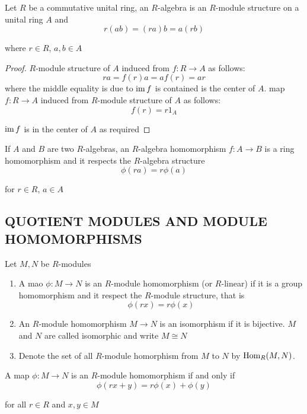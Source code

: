 \begin{remark}
	Let $R$ be a commutative unital ring, an $R$-algebra is an $R$-module structure on a unital ring $A$ and
	$$
		r (ab) = (ra) b = a (rb)
	$$
	
	where $r \in R$, $a, b \in A$
\end{remark}

\begin{proof}
	$R$-module structure of $A$ induced from $f: R \to A$ as follows:
	$$
		r a = f(r) a = a f(r) = a r
	$$
	where the middle equality is due to $\operatorname{im} f$ is contained is the center of $A$. map $f: R \to A$ induced from $R$-module structure of $A$ as follows:
	$$
		f(r) = r 1_A
	$$
	
	$\operatorname{im} f$ is in the center of $A$ as required
\end{proof}


\begin{definition}
	If $A$ and $B$ are two $R$-algebras, an $R$-algebra homomorphism $f: A \to B$ is a ring homomorphism and it respects the $R$-algebra structure
	$$
		\phi(ra)  =r \phi(a)
	$$
	
	for $r \in R$, $a \in A$
\end{definition}

\subsection{QUOTIENT MODULES AND MODULE HOMOMORPHISMS}

\begin{definition}
	Let $M, N$ be $R$-modules
	\begin{enumerate}
		\item A mao $\phi: M \to N$ is an $R$-module homomorphism (or $R$-linear) if it is a group homomorphism and it respect the $R$-module structure, that is
		$$
			\phi(r x) = r \phi(x)
		$$
		
		\item An $R$-module homomorphism $M \to N$ is an isomorphism if it is bijective. $M$ and $N$ are called isomorphic and write $M \cong N$
		
		\item Denote the set of all $R$-module homorphism from $M$ to $N$ by $\operatorname{Hom}_R(M, N)$.
	\end{enumerate}
\end{definition}

\begin{proposition}
	A map $\phi: M \to N$ is an $R$-module homomorphism if and only if
	$$
		\phi(r x + y) = r \phi(x) + \phi(y)
	$$
	
	for all $r \in R$ and $x, y \in M$
\end{proposition}

